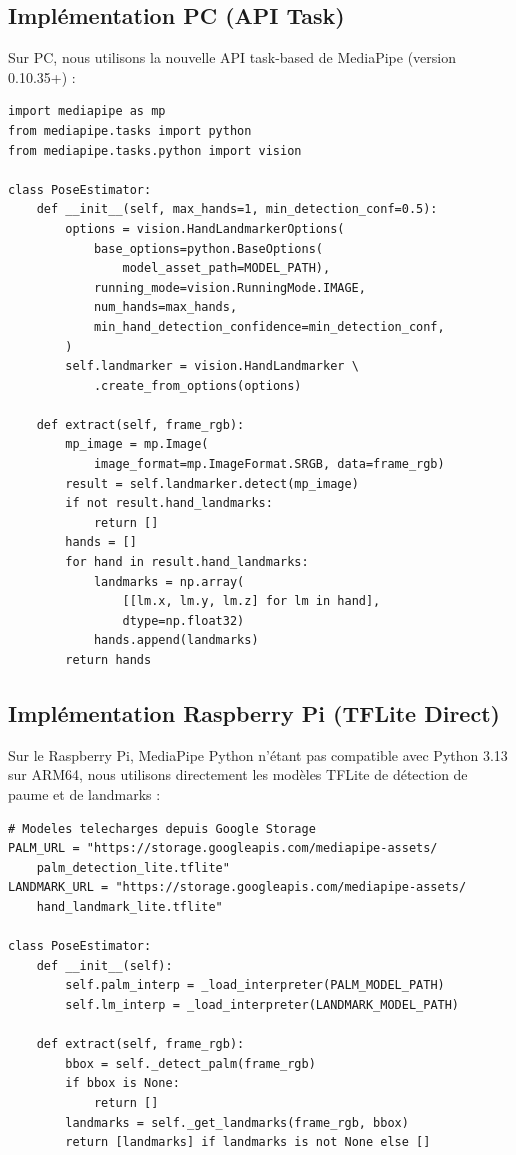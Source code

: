 \subsection{Implémentation PC (API Task)}

Sur PC, nous utilisons la nouvelle API task-based de MediaPipe (version 0.10.35+) :

\begin{lstlisting}[style=python, caption={Estimation de pose -- API Task (PC)}]
import mediapipe as mp
from mediapipe.tasks import python
from mediapipe.tasks.python import vision

class PoseEstimator:
    def __init__(self, max_hands=1, min_detection_conf=0.5):
        options = vision.HandLandmarkerOptions(
            base_options=python.BaseOptions(
                model_asset_path=MODEL_PATH),
            running_mode=vision.RunningMode.IMAGE,
            num_hands=max_hands,
            min_hand_detection_confidence=min_detection_conf,
        )
        self.landmarker = vision.HandLandmarker \
            .create_from_options(options)

    def extract(self, frame_rgb):
        mp_image = mp.Image(
            image_format=mp.ImageFormat.SRGB, data=frame_rgb)
        result = self.landmarker.detect(mp_image)
        if not result.hand_landmarks:
            return []
        hands = []
        for hand in result.hand_landmarks:
            landmarks = np.array(
                [[lm.x, lm.y, lm.z] for lm in hand],
                dtype=np.float32)
            hands.append(landmarks)
        return hands
\end{lstlisting}

\subsection{Implémentation Raspberry Pi (TFLite Direct)}

Sur le Raspberry Pi, MediaPipe Python n'étant pas compatible avec Python 3.13 sur ARM64, nous utilisons directement les modèles TFLite de détection de paume et de landmarks :

\begin{lstlisting}[style=python, caption={Estimation de pose -- TFLite direct (Pi)}]
# Modeles telecharges depuis Google Storage
PALM_URL = "https://storage.googleapis.com/mediapipe-assets/
    palm_detection_lite.tflite"
LANDMARK_URL = "https://storage.googleapis.com/mediapipe-assets/
    hand_landmark_lite.tflite"

class PoseEstimator:
    def __init__(self):
        self.palm_interp = _load_interpreter(PALM_MODEL_PATH)
        self.lm_interp = _load_interpreter(LANDMARK_MODEL_PATH)

    def extract(self, frame_rgb):
        bbox = self._detect_palm(frame_rgb)
        if bbox is None:
            return []
        landmarks = self._get_landmarks(frame_rgb, bbox)
        return [landmarks] if landmarks is not None else []
\end{lstlisting}

